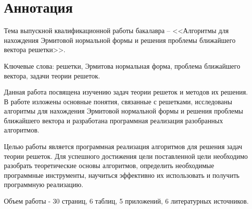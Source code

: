 \newpage
\setcounter{page}{2}

\section*{Аннотация}

Тема выпускной квалификационной работы бакалавра -- <<Алгоритмы для нахождения Эрмитовой нормальной формы и решения проблемы ближайшего вектора решетки>>.

Ключевые слова: решетки, Эрмитова нормальная форма, проблема ближайшего вектора, задачи теории решеток.

Данная работа посвящена изучению задач теории решеток и методов их решения. В работе изложены основные понятия, связанные с решетками, исследованы алгоритмы для нахождения Эрмитовой нормальной формы и решения проблемы ближайшего вектора и разработана программная реализация разобранных алгоритмов.

Целью работы является программная реализация алгоритмов для решения задач теории решеток. Для успешного достижения цели поставленной цели необходимо разобрать теоретические основы алгоритмов, определить необходимые программные инструменты,  научиться эффективно их использовать и получить программную реализацию.

Объем работы - 30 страниц, 6 таблиц, 5 приложений, 6 литературных источников.

\clearpage